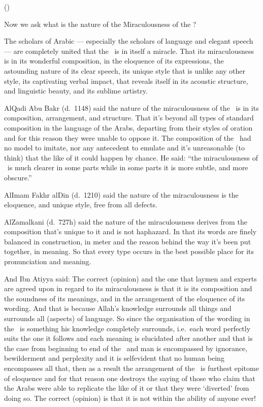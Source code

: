\documentclass[12pt]{memoir}
\begin{document}
()


Now we ask what is the nature of the Miraculousness of the \Quran?

The scholars of Arabic — especially the scholars of language and elegant speech
— are completely united that the \Quran\ is in itself a miracle. That its
miraculousness is in its wonderful composition, in the eloquence of its
expressions, the astounding nature of its clear speech, its unique style that
is unlike any other style, its captivating verbal impact, that reveals itself
in its acoustic structure, and linguistic beauty, and its sublime artistry.

Al\–Qadi Abu Bakr (d.\ 1148) said the nature of the miraculousness
of the \Quran\ is in its composition, arrangement, and structure.
That it’s beyond all types of standard composition
in the language of the Arabs, departing from their
styles of oration and for this reason they were unable to oppose it.
The composition of the \Quran\ had no model to imitate,
nor any antecedent to emulate and it’s unreasonable (to think)
that the like of it could happen by chance.
He said: “the miraculousness of \Quran\ is much clearer in some parts
while in some parts it is more subtle, and more obscure.”\fnmark


Al\–Imam Fakhr al\–Din (d.\ 1210) said the nature of the miraculousness is the
eloquence, and unique style, free from all defects.

Al\–Zamalkani (d.\ 727h) said the nature of the miraculousness derives from the
composition that’s unique to it and is not haphazard.
In that its words are finely balanced in construction,
in meter and the reason behind the way it’s been put together, in meaning.
So that every type occurs in the best possible
place for its pronunciation and meaning.

And Ibn Atiyya said: The correct (opinion) and the one that laymen and experts
are agreed upon in regard to its miraculousness is that it is its composition
and the soundness of its meanings, and in the arrangement of the eloquence of
its wording. And that is because Allah’s knowledge surrounds all things and
surrounds all (aspects) of language. So since the organisation of the wording
in the \Quran\ is something his knowledge completely surrounds, i.e.\ each word
perfectly suits the one it follows and each meaning is elucidated after another
and that is the case from beginning to end of the \Quran\ and man is encompassed
by ignorance, bewilderment and perplexity and it is self\–evident that no human
being encompasses all that, then as a result the arrangement of the \Quran\ is
furthest epitome of eloquence and for that reason one destroys the saying of
those who claim that the Arabs were able to replicate the like of it or that
they were ‘diverted’ from doing so. The correct (opinion) is that it is not
within the ability of anyone ever!\fnmark
\end{document}
